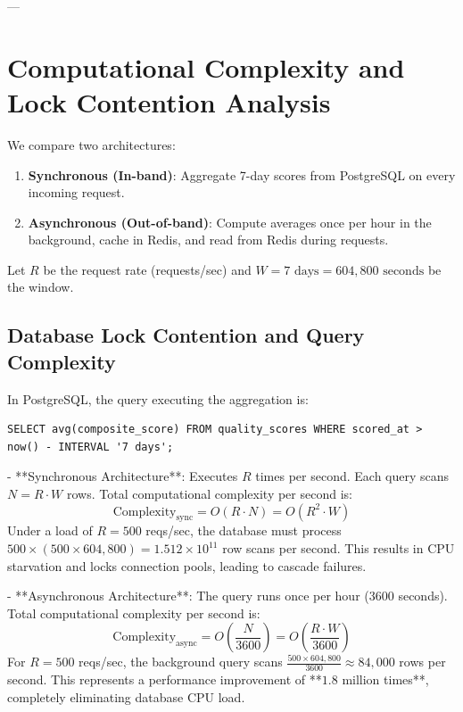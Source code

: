 \documentclass[10pt]{article}
\begin{document}
---

\section{Computational Complexity and Lock Contention Analysis}

We compare two architectures:
\begin{enumerate}
\item \textbf{Synchronous (In-band)}: Aggregate 7-day scores from PostgreSQL on every incoming request.
\item \textbf{Asynchronous (Out-of-band)}: Compute averages once per hour in the background, cache in Redis, and read from Redis during requests.
\end{enumerate}

Let $R$ be the request rate (requests/sec) and $W = 7\text{ days} = 604,800\text{ seconds}$ be the window.

\subsection{Database Lock Contention and Query Complexity}
In PostgreSQL, the query executing the aggregation is:
\begin{verbatim}
SELECT avg(composite_score) FROM quality_scores WHERE scored_at > now() - INTERVAL '7 days';
\end{verbatim}
- **Synchronous Architecture**: Executes $R$ times per second. 
  Each query scans $N = R \cdot W$ rows. 
  Total computational complexity per second is:
  \begin{equation}
  \text{Complexity}_{\text{sync}} = O(R \cdot N) = O(R^2 \cdot W)
  \end{equation}
  Under a load of $R = 500$ reqs/sec, the database must process $500 \times (500 \times 604,800) = 1.512 \times 10^{11}$ row scans per second. This results in CPU starvation and locks connection pools, leading to cascade failures.
  
- **Asynchronous Architecture**: The query runs once per hour (3600 seconds).
  Total computational complexity per second is:
  \begin{equation}
  \text{Complexity}_{\text{async}} = O\left( \frac{N}{3600} \right) = O\left( \frac{R \cdot W}{3600} \right)
  \end{equation}
  For $R = 500$ reqs/sec, the background query scans $\frac{500 \times 604,800}{3600} \approx 84,000$ rows per second. This represents a performance improvement of **$1.8$ million times**, completely eliminating database CPU load.
\end{document}
